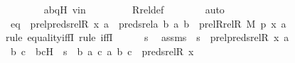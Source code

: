 \begin{isabellebody}
\ \ \ \ \ \ \isamarkupfalse%
\ abqH\ vin\ \isanewline
\ \ \ \ \ \ \isamarkupfalse%
\ Rrel{\isacharunderscore}{\kern0pt}def\isanewline
\ \ \ \ \ \ \isamarkupfalse%
\ auto\isanewline
\ \ \isamarkupfalse%
\isanewline
\isanewline
\ \ \isamarkupfalse%
\ eq{}\ {\isacharcolon}{\kern0pt}\ {\isachardoublequoteopen}prel{\isacharparenleft}{\kern0pt}preds{\isacharunderscore}{\kern0pt}rel{\isacharparenleft}{\kern0pt}R{\isacharcomma}{\kern0pt}\ x{\isacharparenright}{\kern0pt}{\isacharcomma}{\kern0pt}\ {\isacharbraceleft}{\kern0pt}a{\isacharbraceright}{\kern0pt}{\isacharparenright}{\kern0pt}\ {\isacharequal}{\kern0pt}\ preds{\isacharunderscore}{\kern0pt}rel{\isacharparenleft}{\kern0pt}{\isasymlambda}a\ b{\isachardot}{\kern0pt}\ {\isasymlangle}a{\isacharcomma}{\kern0pt}\ b{\isasymrangle}\ {\isasymin}\ prel{\isacharparenleft}{\kern0pt}Rrel{\isacharparenleft}{\kern0pt}R{\isacharcomma}{\kern0pt}\ M{\isacharparenright}{\kern0pt}{\isacharcomma}{\kern0pt}\ p{\isacharparenright}{\kern0pt}{\isacharcomma}{\kern0pt}\ {\isasymlangle}x{\isacharcomma}{\kern0pt}\ a{\isasymrangle}{\isacharparenright}{\kern0pt}{\isachardoublequoteclose}\ \isanewline
\ \ \isamarkupfalse%
{\isacharparenleft}{\kern0pt}rule\ equality{\isacharunderscore}{\kern0pt}iffI{\isacharcomma}{\kern0pt}\ rule\ iffI{\isacharparenright}{\kern0pt}\isanewline
\ \ \ \ \isamarkupfalse%
\ s\ \isamarkupfalse%
\ assms{}\ {\isacharcolon}{\kern0pt}\ {\isachardoublequoteopen}s\ {\isasymin}\ prel{\isacharparenleft}{\kern0pt}preds{\isacharunderscore}{\kern0pt}rel{\isacharparenleft}{\kern0pt}R{\isacharcomma}{\kern0pt}\ x{\isacharparenright}{\kern0pt}{\isacharcomma}{\kern0pt}\ {\isacharbraceleft}{\kern0pt}a{\isacharbraceright}{\kern0pt}{\isacharparenright}{\kern0pt}{\isachardoublequoteclose}\ \isanewline
\ \ \ \ \isamarkupfalse%
\ \isamarkupfalse%
\ b\ c\ \ bcH\ {\isacharcolon}{\kern0pt}\ {\isachardoublequoteopen}s\ {\isacharequal}{\kern0pt}\ {\isacharless}{\kern0pt}{\isacharless}{\kern0pt}b{\isacharcomma}{\kern0pt}\ a{\isachargreater}{\kern0pt}{\isacharcomma}{\kern0pt}\ {\isacharless}{\kern0pt}c{\isacharcomma}{\kern0pt}\ a{\isachargreater}{\kern0pt}{\isachargreater}{\kern0pt}{\isachardoublequoteclose}\ {\isachardoublequoteopen}{\isacharless}{\kern0pt}b{\isacharcomma}{\kern0pt}\ c{\isachargreater}{\kern0pt}\ {\isasymin}\ preds{\isacharunderscore}{\kern0pt}rel{\isacharparenleft}{\kern0pt}R{\isacharcomma}{\kern0pt}\ x{\isacharparenright}{\kern0pt}{\isachardoublequoteclose}\ \isamarkupfalse%

\end{isabellebody}
